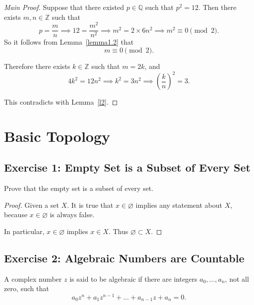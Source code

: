 \documentclass{amsbook}
\theoremstyle{definition}
\theoremstyle{remark}
\numberwithin{section}{chapter}
\numberwithin{equation}{chapter}
\begin{document}
\begin{proof}[Main Proof]
Suppose that there existed $p\in\mathbb{Q}$ such that $p^2=12$. Then there exists $m, n\in\mathbb{Z}$ such that
\[
p=\frac{m}{n} \implies 12=\frac{m^2}{n^2} \implies m^2=2\times 6n^2 \implies m^2\equiv 0 \pmod{2}.
\]
So it follows from Lemma~\ref{lemma1.2} that
\[
m\equiv 0 \pmod{2}.
\]

Therefore there exists $k\in\mathbb{Z}$ such that $m=2k$, and
\[
4k^2=12n^2 \implies k^2=3n^2 \implies \left(\frac{k}{n}\right)^2=3.
\]

This contradicts with Lemma~\ref{l2}.
\end{proof}

\chapter{Basic Topology}
\section{Exercise 1: Empty Set is a Subset of Every Set}
Prove that the empty set is a subset of every set.
\begin{proof}
Given a set $X$. It is true that $x\in\varnothing$ implies any statement about $X$, because $x\in\varnothing$ is always false.

In particular, $x\in\varnothing$ implies $x\in X$. Thus $\varnothing\subset X$.
\end{proof}

\section{Exercise 2: Algebraic Numbers are Countable}
A complex number $z$ is said to be algebraic if there are integers $a_0,\dots,a_n$, not all zero, such that\[
a_0z^n+a_1z^{n-1}+\dots+a_{n-1}z+a_n=0.
\]
\end{document}
